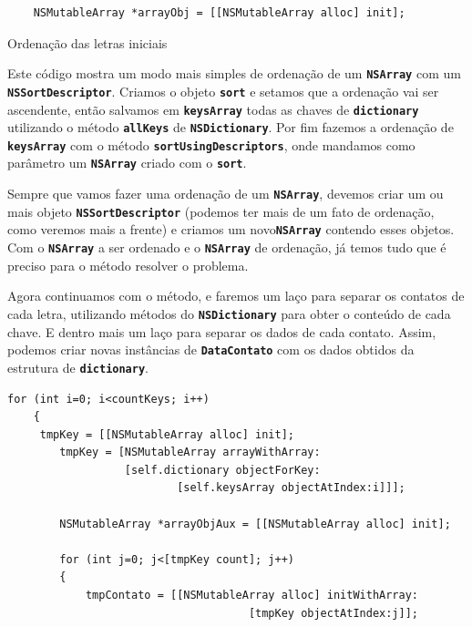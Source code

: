 \documentclass[a4paper,12pt,brazil,doubleside]{book}
\begin{document}
\begin{singlespace}
\begin{listing}[H]
\begin{verbatim}
    NSMutableArray *arrayObj = [[NSMutableArray alloc] init];
\end{verbatim}
\caption{Ordenação das letras iniciais}
\end{listing}


Este código mostra um modo mais simples de ordenação de um \texttt{\textbf{NSArray}} 
com um \texttt{\textbf{NSSortDescriptor}}. Criamos o objeto \texttt{\textbf{sort}} e setamos que a ordenação vai ser ascendente, então salvamos em \texttt{\textbf{keysArray}} todas as chaves de \texttt{\textbf{dictionary}} utilizando o método \texttt{\textbf{allKeys}} de \texttt{\textbf{NSDictionary}}. Por fim fazemos a ordenação de \texttt{\textbf{keysArray}} com o método \texttt{\textbf{sortUsingDescriptors}}, onde mandamos como parâmetro um \texttt{\textbf{NSArray}} criado com o \texttt{\textbf{sort}}.

Sempre que vamos fazer uma ordenação de um \texttt{\textbf{NSArray}}, devemos criar um ou mais objeto \texttt{\textbf{NSSortDescriptor}} (podemos ter mais de um fato de ordenação, como veremos mais a frente) e criamos um novo\texttt{\textbf{NSArray}} contendo esses objetos. Com o \texttt{\textbf{NSArray}} a ser ordenado e o \texttt{\textbf{NSArray}} de ordenação, já temos tudo que é preciso para o método resolver o problema.

Agora continuamos com o método, e faremos um laço para separar os contatos de cada letra, utilizando métodos do \texttt{\textbf{NSDictionary}} para obter o conteúdo de cada chave. E dentro mais um laço para separar os dados de cada contato. Assim, podemos criar novas instâncias de \texttt{\textbf{DataContato}} com os dados obtidos da estrutura de \texttt{\textbf{dictionary}}.

\begin{listing}[H]
\begin{verbatim}
for (int i=0; i<countKeys; i++)
    {
	 tmpKey = [[NSMutableArray alloc] init];
        tmpKey = [NSMutableArray arrayWithArray:
                  [self.dictionary objectForKey:
                          [self.keysArray objectAtIndex:i]]];
        
        NSMutableArray *arrayObjAux = [[NSMutableArray alloc] init];
        
        for (int j=0; j<[tmpKey count]; j++)
        {
            tmpContato = [[NSMutableArray alloc] initWithArray:
                                     [tmpKey objectAtIndex:j]];


\end{verbatim}
\end{listing}
\end{singlespace}
\end{document}
